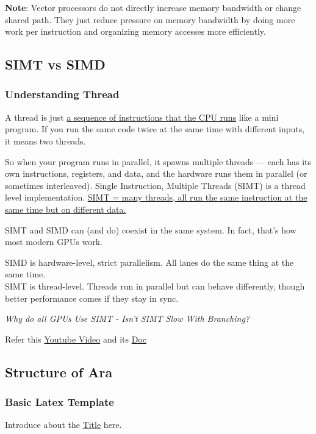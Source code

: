\documentclass[12pt, a4paper]{article}
\begin{document}
\textbf{Note}: Vector processors do not directly increase memory bandwidth or change shared path. They just reduce pressure on memory bandwidth by doing more work per instruction and organizing memory accesses more efficiently.  

\subsection{SIMT vs SIMD}

\subsubsection{Understanding Thread}
A thread is just \ul{a sequence of instructions that the CPU runs} like a mini program. If you run the same code twice at the same time with different inputs, it means two threads.

So when your program runs in parallel, it spawns multiple threads — each has its own instructions, registers, and data, and the hardware runs them in parallel (or sometimes interleaved). 
Single Instruction, Multiple Threads (SIMT) is a thread level implementation. \ul{SIMT = many threads, all run the same instruction at the same time but on different data.}

SIMT and SIMD can (and do) coexist in the same system. In fact, that’s how most modern GPUs work.

SIMD is hardware-level, strict parallelism. All lanes do the same thing at the same time. \\
SIMT is thread-level. Threads run in parallel but can behave differently, though better performance comes if they stay in sync.


\textit{Why do all GPUs Use SIMT - Isn't SIMT Slow With Branching?}

Refer this \href{https://youtu.be/Hf428-u0yFU?si=Y1giRxgAH1q8uhFk}{Youtube Video} and its \href{https://keasigmadelta.com/blog/why-do-gpus-use-simt-isnt-simt-slow-with-branching/}{Doc}

\subsection{Structure of Ara}

\subsubsection{Basic Latex Template}

Introduce about the \underline{Title} here. \\
\end{document}
